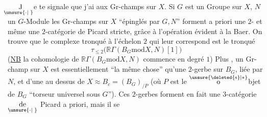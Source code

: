 
$\underset{\hspace{-0.6em}\unsure{\cdot|\phantom{\cdot}}}{\mathrm{J}}$e te signale que j'ai  aux Gr-champs sur $X$. Si $G$ est un Groupe sur $X$, $N$ un $G$-Module les Gr-champs sur $X$ ``épinglés par $G,N$'' forment a priori une $2$- et même une $2$-catégorie de Picard stricte, grâce à l'opération évident à la Baer. On trouve que le complexe  tronqué à l'échelon $2$ qui leur correspond est le tronqué
\[
\tau_{\leq 2}\bigl(\mathbb R\Gamma(B_{G}\mathbin{\mathrm{mod}}X,N)[1]\bigr)
\]
(\uline{NB} la cohomologie de $\mathbb R\Gamma(B_{G}\mathbin{\mathrm{mod}}X,N)$ commence en degré $1$) Plus , un Gr-champ sur $X$   est essentiellement ``la même chose'' qu'une $2$-gerbe sur $B_{G}$, liée par $N$, et  d'une  au dessus de $X\approx B_{c}=(B_{G})_{/P}$ (où $P$ est le $\overset{\unsure{\deleted{\mathrm{s}}|\ast}}{\mathrm{o}}$bjet de $B_{G}$ ``torseur universel sous $G$''). Ces $2$-gerbes forment en fait une $3$-catégorie
$\underset{\unsure{\cdot|\phantom{\cdot}}}{\text{de}}$ Picard a priori, mais il se
